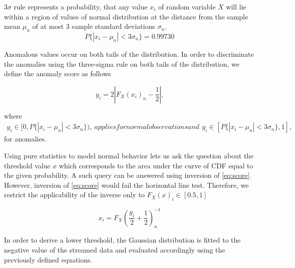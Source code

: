 \begin{definition}
3\(\sigma\) rule represents a probability, that any value \(x_i\) of random variable \(X\) will lie within a region of values of normal distribution at the distance from the sample mean \(\mu_n\) of at most 3 sample standard deviations \(\sigma_n\).
\begin{equation}
P\{|x_i-\mu_n|<3\sigma_n\}=0.99730
\end{equation}
\end{definition}

Anomalous values occur on both tails of the distribution. In order to discriminate the anomalies using the three-sigma rule on both tails of the distribution, we define the anomaly score as follows

\begin{equation}
y_i = 2 \left|{F_X(x_i)_n - \frac{1}{2}}\right|\text{,}\label{eq:score}
\end{equation}

where 
\begin{subequations}

\begin{align}
y_i \in [0,P\{|x_i-\mu_n|<3\sigma_n\})\text{,}\label{eq:score_norm}
\end{align}

applies for normal observations and 

\begin{align}
y_i \in [P\{|x_i-\mu_n|<3\sigma_n\},1]\text{,}\label{eq:score_anomaly}
\end{align}
\end{subequations}
 for anomalies.

Using pure statistics to model normal behavior lets us ask the question about the threshold value \(x\) which corresponds to the area under the curve of CDF equal to the given probability. A such query can be answered using inversion of \eqref{eq:score}. However, inversion of \eqref{eq:score} would fail the horizontal line test. Therefore, we restrict the applicability of the inverse only to \(F_X(x)_i \in [0.5, 1]\)

\begin{equation}
x_i = F_X\left(\frac{y_i}{2}+\frac{1}{2}\right)^{-1}_n\label{realthresh}
\end{equation}

In order to derive a lower threshold, the Gaussian distribution is fitted to the negative value of the streamed data and evaluated accordingly using the previously defined equations.